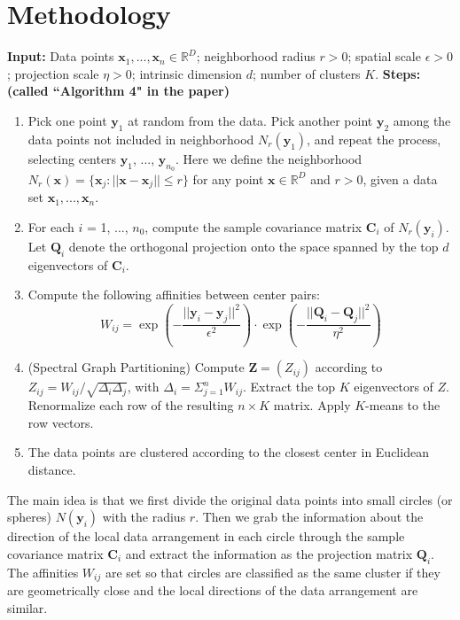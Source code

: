 \section{Methodology}
\vspace{0.1in}
\textbf{Input:} \newline
Data points $\boldsymbol{x}_1, ..., \boldsymbol{x}_n \in \mathbb{R}^D$; neighborhood radius $r>0$; spatial scale $\epsilon>0$; projection scale $\eta>0$; intrinsic dimension $d$; number of clusters $K$. \vspace{0.1in} \newline
\textbf{Steps:  (called ``Algorithm 4" in the paper)}
\begin{enumerate}
\item Pick one point $\boldsymbol{y}_1$ at random from the data. Pick another point $\boldsymbol{y}_2$ among the data points not included in neighborhood $N_r(\boldsymbol{y}_1)$, and repeat the process, selecting centers $\boldsymbol{y}_1$, ..., $\boldsymbol{y}_{n_0}$. Here we define the neighborhood $N_r(\boldsymbol{x})=\{\boldsymbol{x}_j : ||\boldsymbol{x}-\boldsymbol{x}_j|| \leqslant r\}$ for any point $\boldsymbol{x} \in \mathbb{R}^D$ and $r>0$, given a data set $\boldsymbol{x}_1, ..., \boldsymbol{x}_n$.
\item For each $i$ = 1, ..., $n_0$, compute the sample covariance matrix $\boldsymbol{C}_i$ of $N_r(\boldsymbol{y}_i)$. Let $\boldsymbol{Q}_i$ denote the orthogonal projection onto the space spanned by the top $d$ eigenvectors of $\boldsymbol{C}_i$.
\item Compute the following affinities between center pairs:
\begin{equation}
W_{ij}=\exp \left( -\frac{||\boldsymbol{y}_i-\boldsymbol{y}_j||^2}{\epsilon^2} \right) \cdot \exp \left(-\frac{||\boldsymbol{Q}_i-\boldsymbol{Q}_j||^2}{\eta^2} \right)
\end{equation}
\item (Spectral Graph Partitioning) Compute $\boldsymbol{Z} = (Z_{ij})$ according to $Z_{ij} = W_{ij}/\sqrt{\Delta_i \Delta_j}$, with $\Delta_i=\Sigma_{j=1}^{n} W_{ij}$. Extract the top $K$ eigenvectors of $Z$. Renormalize each row of the resulting $n \times K$ matrix. Apply $K$-means to the row vectors.
\item The data points are clustered according to the closest center in Euclidean distance.
\end{enumerate}
\vspace{1em}
The main idea is that we first divide the original data points into small circles (or spheres) $N(\boldsymbol{y}_i)$ with the radius $r$. Then we grab the information about the direction of the local data arrangement in each circle through the sample covariance matrix $\boldsymbol{C}_i$ and extract the information as the projection matrix $\boldsymbol{Q}_i$. The affinities $W_{ij}$ are set so that circles are classified as the same cluster if they are geometrically close and the local directions of the data arrangement are similar.

